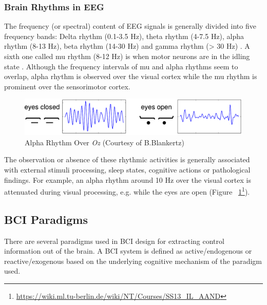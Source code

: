 \documentclass[12pt]{article}
\newcommand\mysubsection[1]{\subsection{#1}}
\newcommand\mysubsubsection[1]{\subsubsection{#1}}
\numberwithin{equation}{section}
\numberwithin{figure}{section}
\numberwithin{table}{section}
\begin{document}
\mysubsubsection{Brain Rhythms in EEG}
\par{
    The frequency (or spectral) content of EEG signals is generally divided into five frequency
    bands: Delta rhythm (0.1-3.5 Hz), theta rhythm (4-7.5 Hz), alpha rhythm (8-13 Hz),
    beta rhythm (14-30 Hz) and gamma rhythm (> 30 Hz) \citep{niedermeyer_electroencephalography:_2005}.
    A sixth one called mu rhythm (8-12 Hz) is when motor neurons are in the idling
    state \citep{wang_practical_2010}. Although the frequency intervals of mu and
    alpha rhythms seem to overlap, alpha rhythm is observed over the visual cortex
    while the mu rhythm is prominent over the sensorimotor cortex.
}
    \par{
    \begin{figure}[ht]
        \centering
        \includegraphics[scale=0.8]{images/alpha_eyes}
        \caption[Alpha Rhythm Over Oz]{Alpha Rhythm Over \emph{Oz} (Courtesy of B.Blankertz)}
        \label{fig:eeg_alpha}
    \end{figure}

    The observation or absence of these rhythmic activities is generally associated
    with external stimuli processing, sleep states, cognitive actions or pathological
    findings. For example, an alpha rhythm around 10 Hz over the visual cortex
    is attenuated during visual processing, e.g. while the eyes are open (Figure ~\ref{fig:eeg_alpha}\footnote{\url{https://wiki.ml.tu-berlin.de/wiki/NT/Courses/SS13_IL_AAND}}).
}

\mysubsection{BCI Paradigms}
\par{
    There are several paradigms used in BCI design for extracting control information
    out of the brain. A BCI system is defined as active/endogenous or
    reactive/exogenous based on the underlying cognitive mechanism of the paradigm used.
}
\end{document}
